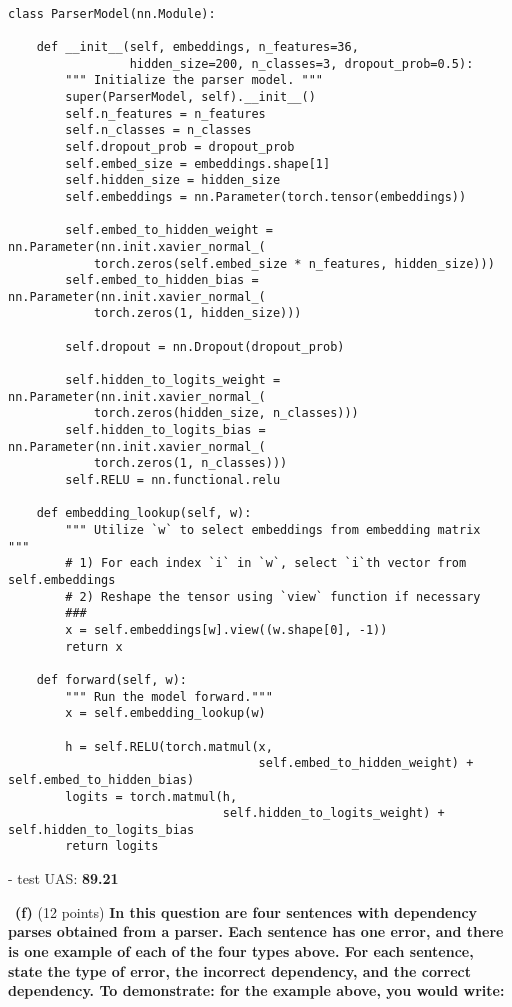 \documentclass[a4 paper]{article}
\newcommand{\subproblem}[1]{~\newline\textbf{(#1)}}
\begin{document}
\begin{lstlisting}[label={list:first},caption=ParserModel class.]

class ParserModel(nn.Module):

    def __init__(self, embeddings, n_features=36,
                 hidden_size=200, n_classes=3, dropout_prob=0.5):
        """ Initialize the parser model. """
        super(ParserModel, self).__init__()
        self.n_features = n_features
        self.n_classes = n_classes
        self.dropout_prob = dropout_prob
        self.embed_size = embeddings.shape[1]
        self.hidden_size = hidden_size
        self.embeddings = nn.Parameter(torch.tensor(embeddings))

        self.embed_to_hidden_weight = nn.Parameter(nn.init.xavier_normal_(
            torch.zeros(self.embed_size * n_features, hidden_size)))
        self.embed_to_hidden_bias = nn.Parameter(nn.init.xavier_normal_(
            torch.zeros(1, hidden_size)))

        self.dropout = nn.Dropout(dropout_prob)

        self.hidden_to_logits_weight = nn.Parameter(nn.init.xavier_normal_(
            torch.zeros(hidden_size, n_classes)))
        self.hidden_to_logits_bias = nn.Parameter(nn.init.xavier_normal_(
            torch.zeros(1, n_classes)))
        self.RELU = nn.functional.relu

    def embedding_lookup(self, w):
        """ Utilize `w` to select embeddings from embedding matrix  """
        # 1) For each index `i` in `w`, select `i`th vector from self.embeddings
        # 2) Reshape the tensor using `view` function if necessary
        ###
        x = self.embeddings[w].view((w.shape[0], -1))
        return x

    def forward(self, w):
        """ Run the model forward."""
        x = self.embedding_lookup(w)

        h = self.RELU(torch.matmul(x,
                                   self.embed_to_hidden_weight) + self.embed_to_hidden_bias)
        logits = torch.matmul(h,
                              self.hidden_to_logits_weight) + self.hidden_to_logits_bias
        return logits
\end{lstlisting}

- test UAS: \textbf{89.21}

\subproblem{f} (12 points) \textbf{In this question are four sentences with dependency parses obtained from a parser.
Each sentence has one error, and there is one example of each of the four types above.
For each sentence, state the type of error, the incorrect dependency, and the correct dependency. To demonstrate: for the example above, you would write:}
\end{document}
